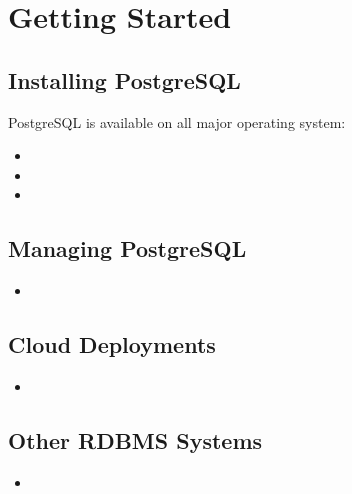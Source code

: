 %
%
%
\section{Getting Started}

\subsection{Installing PostgreSQL}
PostgreSQL is available on all major operating system:

\begin{itemize}
    \item 
    \item
    \item 
\end{itemize}

\subsection{Managing PostgreSQL}

\begin{itemize}
    \item 
\end{itemize}


\subsection{Cloud Deployments}

\begin{itemize}
    \item 
\end{itemize}

\subsection{Other RDBMS Systems}

\begin{itemize}
    \item 
\end{itemize}